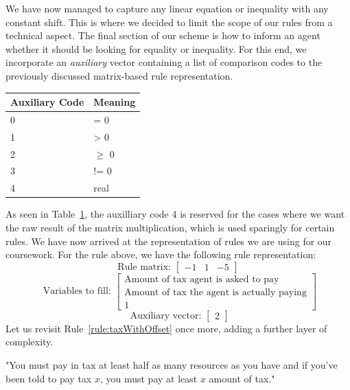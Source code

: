 We have now managed to capture any linear equation or inequality with any constant shift. This is where we decided to limit the scope of our rules from a technical aspect.
The final section of our scheme is how to inform an agent whether it should be looking for equality or inequality.
For this end, we incorporate an \emph{auxiliary} vector containing a list of comparison codes to the previously discussed matrix-based rule representation.\\
\begin{table}[h]
    \centering
    \begin{tabular}{ll}
    \hline
    \multicolumn{1}{|l}{Auxiliary Code} & \multicolumn{1}{l|}{Meaning} \\ \hline
    0                             & = 0                          \\
    1                             & > 0               \\
    2                             & $\geq$ 0            \\
    3                             & != 0                         \\
    4                             & real                        
    \end{tabular}
    \label{table:auxCodeTable}
\end{table}
\linebreak
As seen in Table~\ref{table:auxCodeTable}, the auxilliary code 4 is reserved for the cases where we want the raw result of the matrix multiplication, which is used sparingly for certain rules.
We have now arrived at the representation of rules we are using for our coursework. For the rule above, we have the following rule representation:
\begin{equation}
    \textrm{Rule matrix: }
    \begin{bmatrix}
        -1 & 1 & -5
    \end{bmatrix}      
    \label{equation:initialRM}     
\end{equation}
\begin{equation}
    \textrm{   Variables to fill:  }  
    \begin{bmatrix}
        \textrm{Amount of tax agent is asked to pay} \\
        \textrm{Amount of tax the agent is actually paying} \\
        1
    \end{bmatrix}
\end{equation}
\begin{equation}
    \textrm{   Auxiliary vector: } 
    \begin{bmatrix}
        2 
    \end{bmatrix}   
\end{equation}
Let us revisit Rule~\ref{rule:taxWithOffset} once more, adding a further layer of complexity.
\begin{rule_IIGO}
    "You must pay in tax at least half as many resources as you have and if you've been told to pay tax $x$, you must pay at least $x$ amount of tax."
\end{rule_IIGO}

